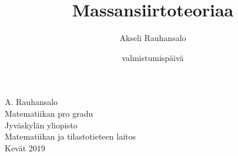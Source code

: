 
\title{Massansiirtoteoriaa}
\author{Akseli Rauhansalo}
\date{valmistumispäivä}


\thispagestyle{empty}                   %
\begin{center}                          %
\null\vspace{3cm}                       %
\Large                                  %
\large                                  %
A. Rauhansalo\\[1cm]                    %
\vfill                                  %
\normalsize                             %
Matematiikan pro gradu\\[1cm]           %
Jyväskylän yliopisto\\                  %
Matematiikan ja tilastotieteen laitos\\ %
Kevät 2019                              %
\end{center}                            %







